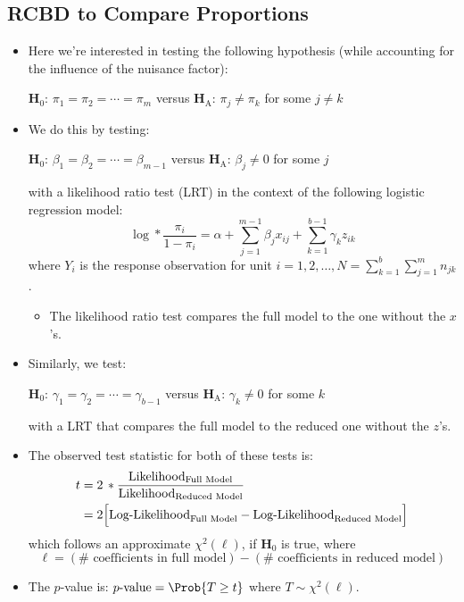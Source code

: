 \subsection{RCBD to Compare Proportions}
\begin{itemize}
      \item Here we're interested in testing the following hypothesis (while accounting for the influence of the
            nuisance factor):
            \begin{tightcenter}
                  $ \mathbf{H}_0 $: $ \pi_1=\pi_2=\cdots=\pi_m $ versus $ \mathbf{H}_\text{A} $: $ \pi_j\ne \pi_k $ for some $ j\ne k $
            \end{tightcenter}
      \item We do this by testing:
            \begin{tightcenter}
                  $ \mathbf{H}_0 $: $ \beta_1=\beta_2=\cdots=\beta_{m-1} $ versus $ \mathbf{H}_\text{A} $: $ \beta_j\ne 0 $ for some $ j$
            \end{tightcenter}
            with a likelihood ratio test (LRT) in the context of the following logistic regression model:
            \[ \log*{\frac{\pi_i}{1-\pi_i}}=\alpha+\sum_{j=1}^{m-1} \beta_j x_{ij}+\sum_{k=1}^{b-1} \gamma_k z_{ik} \]
            where $ Y_i $ is the response observation for unit $ i=1,2,\ldots,N=\sum_{k=1}^{b} \sum_{j=1}^{m} n_{jk} $.
            \begin{itemize}
                  \item The likelihood ratio test compares the full model to the one without the $ x $'s.
            \end{itemize}
      \item Similarly, we test:
            \begin{tightcenter}
                  $ \mathbf{H}_0 $: $ \gamma_1=\gamma_2=\cdots=\gamma_{b-1} $ versus $ \mathbf{H}_\text{A} $: $ \gamma_k\ne 0 $ for some $ k $
            \end{tightcenter}
            with a LRT that compares the full model to the reduced one without the $ z $'s.
      \item The observed test statistic for both of these tests is:
            \begin{align*}
                  t & =2\,\log*{\frac{\text{Likelihood}_{\text{Full Model}}}{\text{Likelihood}_{\text{Reduced Model}}}}    \\
                    & =2\Bigl[\text{Log-Likelihood}_{\text{Full Model}}-\text{Log-Likelihood}_{\text{Reduced Model}}\Bigr]
            \end{align*}
            which follows an approximate $ \chi^2(\ell) $, if $ \mathbf{H}_0 $ is true, where
            \[ \ell=(\#\text{ coefficients in full model})-(\#\text{ coefficients in reduced model}) \]
      \item The $ p $-value is: $ p\text{-value}=\Prob{T\ge t} $ where $ T \sim \chi^2(\ell) $.
\end{itemize}
